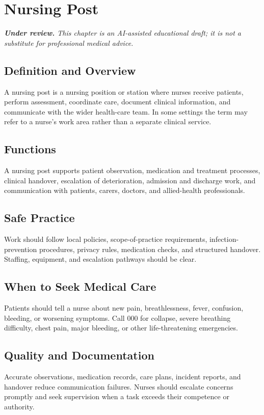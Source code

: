 \chapter{Nursing Post}

\medskip
\noindent\textit{\textbf{Under review.} This chapter is an AI-assisted educational draft; it is not a substitute for professional medical advice.}

\section*{Definition and Overview}
A nursing post is a nursing position or station where nurses receive patients, perform assessment, coordinate care, document clinical information, and communicate with the wider health-care team. In some settings the term may refer to a nurse's work area rather than a separate clinical service.

\section*{Functions}
A nursing post supports patient observation, medication and treatment processes, clinical handover, escalation of deterioration, admission and discharge work, and communication with patients, carers, doctors, and allied-health professionals.

\section*{Safe Practice}
Work should follow local policies, scope-of-practice requirements, infection-prevention procedures, privacy rules, medication checks, and structured handover. Staffing, equipment, and escalation pathways should be clear.

\section*{When to Seek Medical Care}
Patients should tell a nurse about new pain, breathlessness, fever, confusion, bleeding, or worsening symptoms. Call 000 for collapse, severe breathing difficulty, chest pain, major bleeding, or other life-threatening emergencies.

\section*{Quality and Documentation}
Accurate observations, medication records, care plans, incident reports, and handover reduce communication failures. Nurses should escalate concerns promptly and seek supervision when a task exceeds their competence or authority.

